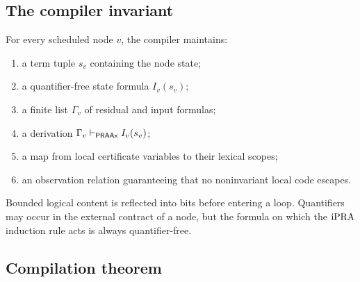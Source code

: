\subsection{The compiler invariant}

For every scheduled node \(v\), the compiler maintains:

\begin{enumerate}
\item a term tuple \(s_v\) containing the node state;
\item a quantifier-free state formula \(I_v(s_v)\);
\item a finite list \(\Gamma_v\) of residual and input formulas;
\item a derivation \(\Gamma_v\vdash_{\mathsf{PRAAx}}I_v(s_v)\);
\item a map from local certificate variables to their lexical scopes;
\item an observation relation guaranteeing that no noninvariant local code
      escapes.
\end{enumerate}

Bounded logical content is reflected into bits before entering a loop.
Quantifiers may occur in the external contract of a node, but the formula on
which the \(\mathrm{iPRA}\) induction rule acts is always quantifier-free.

\subsection{Compilation theorem}

